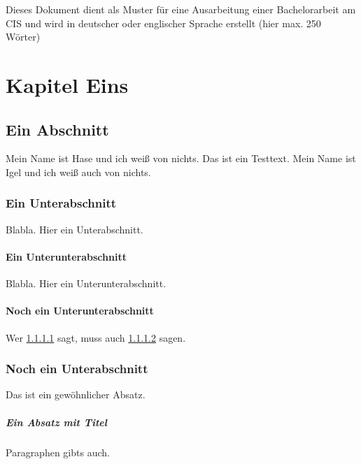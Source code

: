 \documentclass[11pt,a4paper,twoside,openright]{scrbook}
\begin{document}
\deckblatt

\pagestyle{scrheadings}

\erklaerung

\thispagestyle{scrplain}
\noindent
Dieses Dokument dient als Muster für eine Ausarbeitung einer
Bachelorarbeit am CIS und wird in deutscher oder englischer Sprache
erstellt (hier max. 250 Wörter)


\tableofcontents


\chapter{Kapitel Eins}
\cite{irbook}

\section{Ein Abschnitt}
Mein Name ist Hase und ich weiß von nichts. Das ist ein Testtext. Mein Name ist
Igel und ich weiß auch von nichts.

\subsection{Ein Unterabschnitt}
Blabla. Hier ein Unterabschnitt.

\subsubsection{Ein Unterunterabschnitt}
\label{sec:a}
Blabla. Hier ein Unterunterabschnitt.

\subsubsection{Noch ein Unterunterabschnitt}
\label{sec:b}

Wer \ref{sec:a} sagt, muss auch \ref{sec:b} sagen.

\subsection{Noch ein Unterabschnitt}

Das ist ein gewöhnlicher Absatz.

\paragraph{Ein Absatz mit Titel}
Paragraphen gibts auch.
\end{document}

